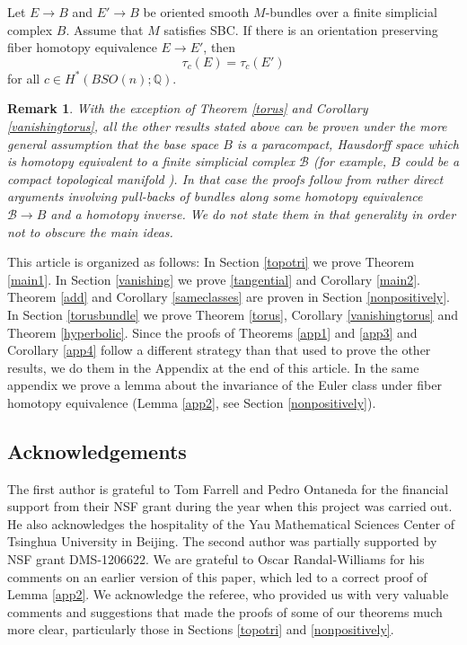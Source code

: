 \documentclass[onecolumn,notitlepage,11pt]{article}
\newcommand{\Q}{\mathbb{Q}}
\newcommand{\beq}{\begin{equation*}}
\newcommand{\eeq}{\end{equation*}}
\newtheorem{rmk}{Remark}
\newenvironment{customcoro}[1]
  {\renewcommand\theinnercustomcoro{#1}\innercustomcoro}
  {\endinnercustomcoro}
\theoremstyle{definition}
\begin{document}
\begin{customcoro}{G.1}\label{app4}
Let  $E\to B$ and $E'\to B$ be oriented smooth 
$M$-bundles over a finite simplicial complex $B$. 
Assume that $M$ satisfies SBC. If there
is an orientation preserving fiber
homotopy equivalence $E\to E'$, then
\beq
\tau_c(E)=\tau_c(E')
\eeq
for all $c\in H^*(BSO(n);\Q)$.
\end{customcoro}
\begin{rmk}
With the exception of Theorem \ref{torus} and
Corollary \ref{vanishingtorus}, all the other
results stated above can be 
proven under the more general 
assumption that the base space $B$ is a paracompact, Hausdorff 
space which is homotopy equivalent to a finite
simplicial complex $\mathcal{B}$ 
(for example, $B$ could be a compact topological manifold \cite{triangulation}). In that case the 
proofs follow from rather direct arguments involving 
pull-backs of bundles along some homotopy
equivalence $\mathcal{B}\to B$ and a homotopy 
inverse.
We do not state them in that generality in order not to obscure the main ideas.
\end{rmk}
This article is organized as follows: In Section \ref{topotri} we 
prove Theorem \ref{main1}. In Section \ref{vanishing} we prove \ref{tangential} and Corollary \ref{main2}. Theorem \ref{add} and 
Corollary \ref{sameclasses} are proven in Section \ref{nonpositively}.
In Section \ref{torusbundle}
we prove Theorem \ref{torus}, Corollary
\ref{vanishingtorus} and Theorem \ref{hyperbolic}.
Since the proofs of Theorems \ref{app1} and
\ref{app3} and Corollary \ref{app4} follow a different strategy than that used to prove
the other results, we do 
them in the
Appendix at the end of this article. In the same appendix we 
prove a lemma about the invariance of the Euler class under 
fiber homotopy equivalence 
(Lemma \ref{app2}, see Section \ref{nonpositively}). 

\subsection*{Acknowledgements}
The first author is grateful to Tom Farrell and Pedro Ontaneda
for the
financial support from their NSF grant
during the year when this project
was carried out. He also acknowledges the hospitality
of the Yau Mathematical Sciences Center of Tsinghua University
in Beijing. The second author was partially supported by NSF
grant DMS-1206622. We are grateful to Oscar Randal-Williams for
his comments on an earlier
version of this paper, which led to a correct
proof of Lemma \ref{app2}.
We acknowledge the referee, who provided us with
very valuable comments and suggestions that made the proofs of
some of our theorems much more clear, particularly those in
Sections \ref{topotri} and \ref{nonpositively}.
\end{document}
